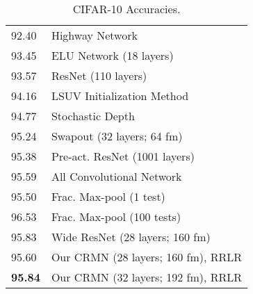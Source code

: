 \documentclass{article}
\begin{document}
\begin{table}[!htb]
\begin{minipage}{.5\linewidth}
\begin{tabular}{ |p{.5cm} p{5.5cm}|}
    92.40  & Highway Network \cite{srivastava2015training} \\
    93.45 & ELU Network \cite{clevert2015fast} (18 layers) \\ \hline
    93.57 & ResNet (110 layers) \cite{he2015deep} \\
94.16 & LSUV Initialization Method \cite{DBLP:journals/corr/MishkinM15} \\  \hline
94.77 & Stochastic Depth \cite{huang2016deep} \\
95.24 & Swapout \cite{singhHF2016swapout} (32 layers; 64 fm) \\ \hline
95.38 & Pre-act. ResNet \cite{he2016identity} (1001 layers) \\
95.59 & All Convolutional Network \cite{springenberg2014striving}  \\ \hline
95.50 & Frac. Max-pool \cite{graham2014fractional} (1 test) \\
96.53 & Frac. Max-pool  \cite{graham2014fractional} (100 tests) \\ \hline
95.83 & Wide ResNet
\cite{zagoruyko2016wide} (28 layers; 160 fm) \\ \hline \hline
     95.60 & Our CRMN (28 layers; 160 fm), RRLR  \\
     \textbf{95.84} & Our CRMN (32 layers; 192 fm), RRLR  \\ \hline
    \end{tabular}
\caption{CIFAR-10 Accuracies.}
\label{tab:cifar10}
 \end{minipage}%
%
\end{table}
\end{document}
